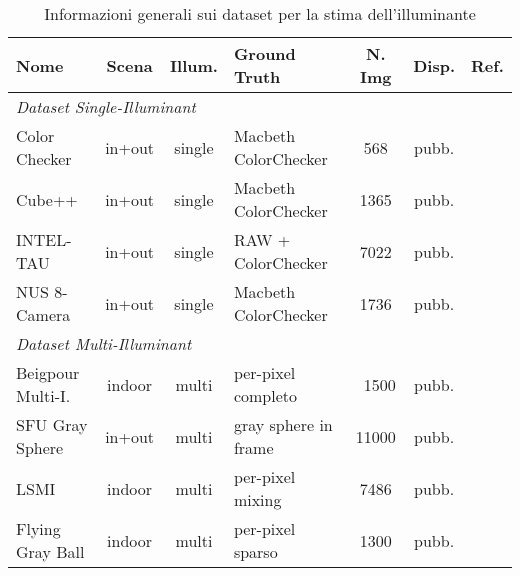 \begin{table}[htbp]
\centering
\caption{Informazioni generali sui dataset per la stima dell'illuminante}
\label{tab:datasets}
\footnotesize
\begin{tabularx}{\textwidth}{lccXccl}
\toprule
\textbf{Nome} & \textbf{Scena} & \textbf{Illum.} & \textbf{Ground Truth} & \textbf{N. Img} & \textbf{Disp.} & \textbf{Ref.} \\
\midrule
\multicolumn{7}{l}{\textit{Dataset Single-Illuminant}} \\
\midrule
Color Checker & in+out & single & Macbeth ColorChecker & 568 & pubb. & \cite{gehler_bayesian_2008} \\
Cube++ & in+out & single & Macbeth ColorChecker & 1365 & pubb. & \cite{ershov_cube_2020} \\
INTEL-TAU & in+out & single & RAW + ColorChecker & 7022 & pubb. & \cite{laakom_intel-tau_2020} \\
NUS 8-Camera & in+out & single & Macbeth ColorChecker & 1736 & pubb. & \cite{cheng_illuminant_2014} \\
\midrule
\multicolumn{7}{l}{\textit{Dataset Multi-Illuminant}} \\
\midrule
Beigpour Multi-I. & indoor & multi & per-pixel completo & ~1500 & pubb. & \cite{beigpour_multi-illuminant_2013} \\
SFU Gray Sphere & in+out & multi & gray sphere in frame & 11000 & pubb. & \cite{aghaei_flying_2020} \\
LSMI & indoor & multi & per-pixel mixing & 7486 & pubb. & \cite{kim_large_2021} \\
Flying Gray Ball & indoor & multi & per-pixel sparso & 1300 & pubb. & \cite{ciurea_large_2003} \\
\bottomrule
\end{tabularx}
\end{table}

